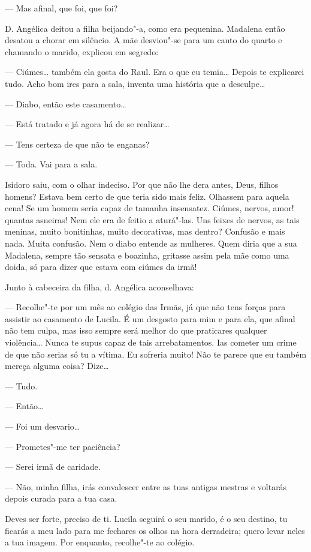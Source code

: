 --- Mas afinal, que foi, que foi?

D. Angélica deitou a filha beijando"-a, como era pequenina. Madalena
então desatou a chorar em silêncio. A mãe desviou"-se para um canto do
quarto e chamando o marido, explicou em segredo:

--- Ciúmes\ldots{} também ela gosta do Raul. Era o que eu temia\ldots{} Depois te
explicarei tudo. Acho bom ires para a sala, inventa uma história que a
desculpe\ldots{}

--- Diabo, então este casamento\ldots{}

--- Está tratado e já agora há de se realizar\ldots{}

--- Tens certeza de que não te enganas?

--- Toda. Vai para a sala.

Isidoro saiu, com o olhar indeciso. Por que não lhe dera antes, Deus,
filhos homens? Estava bem certo de que teria sido mais feliz. Olhassem
para aquela cena! Se um homem seria capaz de tamanha insensatez. Ciúmes,
nervos, amor! quantas asneiras! Nem ele era de feitio a aturá"-las. Uns
feixes de nervos, as tais meninas, muito bonitinhas, muito decorativas,
mas dentro? Confusão e mais nada. Muita confusão. Nem o diabo entende as
mulheres. Quem diria que a sua Madalena, sempre tão sensata e boazinha,
gritasse assim pela mãe como uma doida, só para dizer que estava com
ciúmes da irmã!

Junto à cabeceira da filha, d. Angélica aconselhava:

--- Recolhe"-te por um mês ao colégio das Irmãs, já que não tens forças
para assistir ao casamento de Lucila. É um desgosto para mim e para ela,
que afinal não tem culpa, mas isso sempre será melhor do que praticares
qualquer violência\ldots{} Nunca te supus capaz de tais arrebatamentos. Ias
cometer um crime de que não serias só tu a vítima. Eu sofreria muito!
Não te parece que eu também mereça alguma coisa? Dize\ldots{}

--- Tudo.

--- Então\ldots{}

--- Foi um desvario\ldots{}

--- Prometes"-me ter paciência?

--- Serei irmã de caridade.

--- Não, minha filha, irás convalescer entre as tuas antigas mestras e
voltarás depois curada para a tua casa.

Deves ser forte, preciso de ti. Lucila seguirá o seu marido, é o seu
destino, tu ficarás a meu lado para me fechares os olhos na hora
derradeira; quero levar neles a tua imagem. Por enquanto, recolhe"-te ao
colégio.

